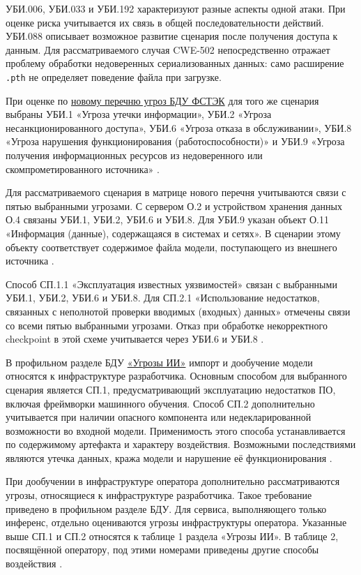\documentclass[12pt,a4paper]{report}
\begin{document}
УБИ.006, УБИ.033 и УБИ.192 характеризуют разные аспекты одной атаки. При оценке риска учитывается их связь в общей последовательности действий. УБИ.088 описывает возможное развитие сценария после получения доступа к данным. Для рассматриваемого случая CWE-502 непосредственно отражает проблему обработки недоверенных сериализованных данных: само расширение \texttt{.pth} не определяет поведение файла при загрузке.

При оценке по \href{https://bdu.fstec.ru/threat-section/threats}{новому перечню угроз БДУ ФСТЭК} для того же сценария выбраны УБИ.1 «Угроза утечки информации», УБИ.2 «Угроза несанкционированного доступа», УБИ.6 «Угроза отказа в обслуживании», УБИ.8 «Угроза нарушения функционирования (работоспособности)» и УБИ.9 «Угроза получения информационных ресурсов из недоверенного или скомпрометированного источника» \cite{bduubi}.

Для рассматриваемого сценария в матрице нового перечня учитываются связи с пятью выбранными угрозами. С сервером О.2 и устройством хранения данных О.4 связаны УБИ.1, УБИ.2, УБИ.6 и УБИ.8. Для УБИ.9 указан объект О.11 «Информация (данные), содержащаяся в системах и сетях». В сценарии этому объекту соответствует содержимое файла модели, поступающего из внешнего источника \cite{bduubi}.

Способ СП.1.1 «Эксплуатация известных уязвимостей» связан с выбранными УБИ.1, УБИ.2, УБИ.6 и УБИ.8. Для СП.2.1 «Использование недостатков, связанных с неполнотой проверки вводимых (входных) данных» отмечены связи со всеми пятью выбранными угрозами. Отказ при обработке некорректного checkpoint в этой схеме учитывается через УБИ.6 и УБИ.8 \cite{bduubi}.

В профильном разделе БДУ \href{https://bdu.fstec.ru/threat/ai}{«Угрозы ИИ»} импорт и дообучение модели относятся к инфраструктуре разработчика. Основным способом для выбранного сценария является СП.1, предусматривающий эксплуатацию недостатков ПО, включая фреймворки машинного обучения. Способ СП.2 дополнительно учитывается при наличии опасного компонента или недекларированной возможности во входной модели. Применимость этого способа устанавливается по содержимому артефакта и характеру воздействия. Возможными последствиями являются утечка данных, кража модели и нарушение её функционирования \cite{bduai}.

При дообучении в инфраструктуре оператора дополнительно рассматриваются угрозы, относящиеся к инфраструктуре разработчика. Такое требование приведено в профильном разделе БДУ. Для сервиса, выполняющего только инференс, отдельно оцениваются угрозы инфраструктуры оператора. Указанные выше СП.1 и СП.2 относятся к таблице 1 раздела «Угрозы ИИ». В таблице 2, посвящённой оператору, под этими номерами приведены другие способы воздействия \cite{bduai}.
\end{document}
